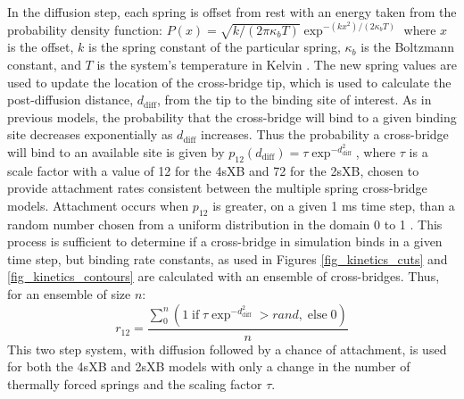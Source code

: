 \documentclass[10pt]{article}
\newcommand{\citep}[1]{\cite{#1}} %
\begin{document}
In the diffusion step, each spring is offset from rest with an energy taken from the probability density function: $P(x) = \sqrt{k / (2 \pi \kappa_b T)} \exp^{-(k x^2)/(2 \kappa_b T)}$ where $x$ is the offset, $k$ is the spring constant of the particular spring, $\kappa_b$ is the Boltzmann constant, and $T$ is the system's temperature in Kelvin  \citep{DillBook, HowardBook}. 
The new spring values are used to update the location of the cross-bridge tip, which is used to calculate the post-diffusion distance, $d_\mathrm{diff}$, from the tip to the binding site of interest.
As in previous models, the probability that the cross-bridge will bind to a given binding site decreases exponentially as $d_\mathrm{diff}$ increases. 
Thus the probability a cross-bridge will bind to an available site is given by $p_{12}(d_\mathrm{diff}) = \tau \exp ^{-d_\mathrm{diff}^2}$, where $\tau$ is a scale factor with a value of 12 for the 4sXB and 72 for the 2sXB, chosen to provide attachment rates consistent between the multiple spring cross-bridge models.
Attachment occurs when $p_{12}$ is greater, on a given 1 ms time step, than a random number chosen from a uniform distribution in the domain 0 to 1 \citep{Tanner2007}.
This process is sufficient to determine if a cross-bridge in simulation binds in a given time step, but binding rate constants, as used in Figures \ref{fig_kinetics_cuts} and \ref{fig_kinetics_contours} are calculated with an ensemble of cross-bridges. 
Thus, for an ensemble of size $n$:
\begin{equation}
    r_{12} =  \frac{\sum_0^n \left( 1\; \textrm{if}\; \tau \exp^{-d_\mathrm{diff}^2}>rand ,\; \textrm{else}\; 0 \right)}{n}  
    \label{eq_r12}
\end{equation}
This two step system, with diffusion followed by a chance of attachment, is used for both the 4sXB and 2sXB models with only a change in the number of thermally forced springs and the scaling factor $\tau$.
\end{document}
